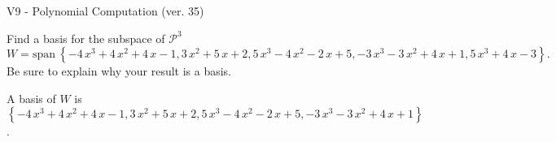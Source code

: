 \begin{exercise}
  \begin{exerciseTitle}V9 - Polynomial Computation (ver. 35)\end{exerciseTitle}
  \begin{exerciseStatement}
    Find a basis for the subspace of \(\mathcal{P}^3\) 
\[W=\mathrm{span}\ \left\{-4 \, x^{3} + 4 \, x^{2} + 4 \, x - 1 , 3 \, x^{2} + 5 \, x + 2 , 5 \, x^{3} - 4 \, x^{2} - 2 \, x + 5 , -3 \, x^{3} - 3 \, x^{2} + 4 \, x + 1 , 5 \, x^{3} + 4 \, x - 3\right\}.\]
 Be sure to explain why your result is a basis.


  \end{exerciseStatement}
  \begin{exerciseAnswer}
   A basis of \(W\) is  \(\left\{-4 \, x^{3} + 4 \, x^{2} + 4 \, x - 1 , 3 \, x^{2} + 5 \, x + 2 , 5 \, x^{3} - 4 \, x^{2} - 2 \, x + 5 , -3 \, x^{3} - 3 \, x^{2} + 4 \, x + 1\right\}\).
  


  \end{exerciseAnswer}
\end{exercise}